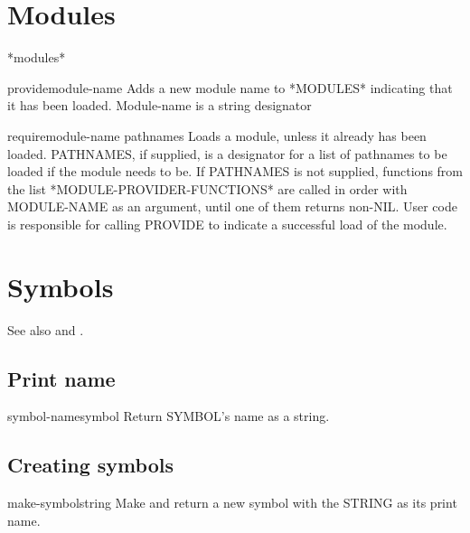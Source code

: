 \documentclass[10pt,english]{book}
\begin{document}
\section{Modules}
\label{sec:modules}

\begin{variable}{*modules*}{}
  
\end{variable}

\begin{function}{provide}{module-name}
  Adds a new module name to *MODULES* indicating that it has been loaded.
   Module-name is a string designator
\end{function}

\begin{function}{require}{module-name \op pathnames}
  Loads a module, unless it already has been loaded. PATHNAMES, if supplied,
   is a designator for a list of pathnames to be loaded if the module
   needs to be. If PATHNAMES is not supplied, functions from the list
   *MODULE-PROVIDER-FUNCTIONS* are called in order with MODULE-NAME
   as an argument, until one of them returns non-NIL.  User code is
   responsible for calling PROVIDE to indicate a successful load of the
   module.
\end{function}

\section{Symbols}
\label{sec:symbols}

See also  and .

\subsection{Print name}
\label{sec:print-name}

\begin{function}{symbol-name}{symbol}
  Return SYMBOL's name as a string.
\end{function}

\subsection{Creating symbols}
\label{sec:creating-symbols}

\begin{function}{make-symbol}{string}
  Make and return a new symbol with the STRING as its print name.
\end{function}
\end{document}
